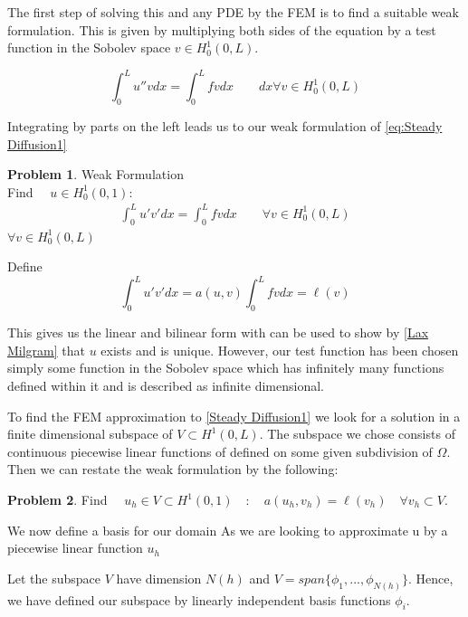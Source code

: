 \documentclass{uonmathreport}
\theoremstyle{definition}
\theoremstyle{problem}
\newtheorem{problem}{Problem}[section]
\theoremstyle{theorem}
\begin{document}
The first step of solving this and any PDE by the FEM is to find a suitable weak formulation. This is given by multiplying both sides of the equation by a test function in the Sobolev space $v \in H^1_0(0, L)$.

\begin{equation*}
\int_0^L  u'' v  dx = \int_0^L  f v dx 	\quad \quad  dx \forall v \in H^1_0(0, L)
\end{equation*}

Integrating by parts on the left leads us to our weak formulation of \ref{eq:Steady Diffusion1}

\begin{problem}{Weak Formulation} \label{prob:Weak Formulation Elliptic}
\\Find $\quad u \in H^1_0(0, 1)$:
\begin{align*}
\int_0^L  u' v'  dx =   \int_0^L  f v dx  \quad \quad  \forall v \in H^1_0(0, L)
\end{align*}
$\forall v \in H^1_0(0, L)$
\end{problem}

Define 
\begin{equation*}
\int_0^L  u' v'  dx = a(u, v)  	
\int_0^L  f v dx  =  \ell(v)
\end{equation*}

This gives us the linear and bilinear form with can be used to show by \ref{Lax Milgram} that $u$ exists and is unique. However, our test function has been chosen simply some function in the Sobolev space which has infinitely many functions defined within it and is described as infinite dimensional. 

To find the FEM approximation to \ref{Steady Diffusion1} we look for a solution in a finite dimensional subspace of $V\subset H^1(0, L) $. The subspace we chose consists of continuous piecewise linear functions of defined on some given subdivision of $\Omega$. Then we can restate the weak formulation by the following:

\begin{problem} \label{prob:Approx1}
Find $\quad u_h \in  V\subset H^1(0, 1) \quad : \quad a(u_h, v_h) =  \ell(v_h) \quad \forall v_h \subset V.$
\end{problem}

We now define a basis for our domain 
As we are looking to approximate u by a piecewise linear function $u_h$ 

Let the subspace $V$ have dimension $N(h)$ and $V = span\{\phi_1, ..., \phi_{N(h)}\}$. Hence, we have defined our subspace by linearly independent basis functions $\phi_i$.
\end{document}
